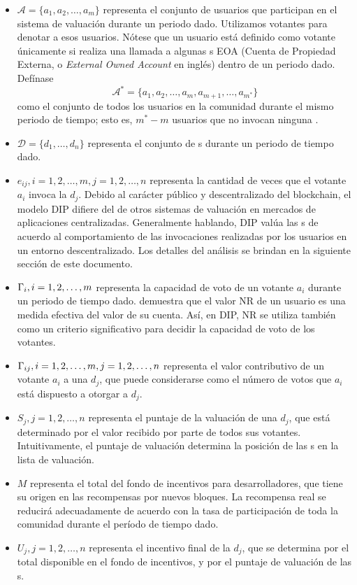 \begin{itemize}
	\item $\mathcal{A}=\{a_1,a_2,\ldots,a_m\}$ representa el conjunto de usuarios que participan en el sistema de valuación durante un periodo dado. Utilizamos votantes para denotar a esos usuarios. Nótese que un usuario está definido como votante únicamente si realiza una llamada a algunas {\dapp}s EOA (Cuenta de Propiedad Externa, o \textit{External Owned Account} en inglés) dentro de un periodo dado. Defínase
	  $$\mathcal{A}^*=\{a_1,a_2,\ldots,a_m,a_{m+1},\ldots,a_{m^*}\}$$
	como el conjunto de todos los usuarios en la comunidad durante el mismo periodo de tiempo; esto es, $m^*-m$ usuarios que no invocan ninguna \dapp.
  \item $\mathcal{D}=\{d_1,\ldots,d_n\}$ representa el conjunto de {\dapp}s durante un periodo de tiempo dado.
  \item $e_{ij},i=1,2,\ldots,m, j=1,2,\ldots,n$ representa la cantidad de veces que el votante $a_i$ invoca la \dapp $d_j$. Debido al carácter público y descentralizado del blockchain, el modelo DIP difiere del de otros sistemas de valuación en mercados de aplicaciones centralizadas. Generalmente hablando, DIP valúa las {\dapp}s de acuerdo al comportamiento de las invocaciones realizadas por los usuarios en un entorno descentralizado. Los detalles del análisis se brindan en la siguiente sección de este documento.

  \item $\Gamma_i, i=1,2,\ldots,m$ representa la capacidad de voto de un votante $a_i$ durante un periodo de tiempo dado.
  \cite{Nebulasyellowpaper} demuestra que el valor NR de un usuario es una medida efectiva del valor de su cuenta. Así, en DIP, NR se utiliza también como un criterio significativo para decidir la capacidad de voto de los votantes.
  \item $\Gamma_{ij}, i=1,2,\ldots,m,j=1,2,\ldots,n$ representa el valor contributivo de un votante $a_i$ a una \dapp $d_j$, que puede considerarse como el número de votos que $a_i$ está dispuesto a otorgar a $d_j$.

  \item $S_j, j=1,2,\ldots,n$ representa el puntaje de la valuación de una \dapp $d_j$, que está determinado por el valor recibido por parte de todos sus votantes. Intuitivamente, el puntaje de valuación determina la posición de las {\dapp}s en la lista de valuación.

  	\item $M$ representa el total del fondo de incentivos para desarrolladores, que tiene su origen en las recompensas por nuevos bloques. La recompensa real se reducirá adecuadamente de acuerdo con la tasa de participación de toda la comunidad durante el período de tiempo dado.
   \item $U_j, j=1,2,\ldots,n$ representa el incentivo final de la \dapp $d_j$, que se determina por el total disponible en el fondo de incentivos, y por el puntaje de valuación de las {\dapp}s.
 \end{itemize}
